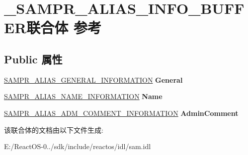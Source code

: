 \hypertarget{union___s_a_m_p_r___a_l_i_a_s___i_n_f_o___b_u_f_f_e_r}{}\section{\+\_\+\+S\+A\+M\+P\+R\+\_\+\+A\+L\+I\+A\+S\+\_\+\+I\+N\+F\+O\+\_\+\+B\+U\+F\+F\+E\+R联合体 参考}
\label{union___s_a_m_p_r___a_l_i_a_s___i_n_f_o___b_u_f_f_e_r}
\subsection*{Public 属性}
\begin{DoxyCompactItemize}
\item 
\mbox{\label{union___s_a_m_p_r___a_l_i_a_s___i_n_f_o___b_u_f_f_e_r_ac69424f6da4a4bd05ef6e1cb63c475ef}} 
\hyperlink{struct___s_a_m_p_r___a_l_i_a_s___g_e_n_e_r_a_l___i_n_f_o_r_m_a_t_i_o_n}{S\+A\+M\+P\+R\+\_\+\+A\+L\+I\+A\+S\+\_\+\+G\+E\+N\+E\+R\+A\+L\+\_\+\+I\+N\+F\+O\+R\+M\+A\+T\+I\+ON} {\bfseries General}
\item 
\mbox{\label{union___s_a_m_p_r___a_l_i_a_s___i_n_f_o___b_u_f_f_e_r_a81bbde9e862f25b075d5a0eec5806db6}} 
\hyperlink{struct___s_a_m_p_r___a_l_i_a_s___n_a_m_e___i_n_f_o_r_m_a_t_i_o_n}{S\+A\+M\+P\+R\+\_\+\+A\+L\+I\+A\+S\+\_\+\+N\+A\+M\+E\+\_\+\+I\+N\+F\+O\+R\+M\+A\+T\+I\+ON} {\bfseries Name}
\item 
\mbox{\label{union___s_a_m_p_r___a_l_i_a_s___i_n_f_o___b_u_f_f_e_r_ade295bf4292b302bd84742dcdd98f7e0}} 
\hyperlink{struct___s_a_m_p_r___a_l_i_a_s___a_d_m___c_o_m_m_e_n_t___i_n_f_o_r_m_a_t_i_o_n}{S\+A\+M\+P\+R\+\_\+\+A\+L\+I\+A\+S\+\_\+\+A\+D\+M\+\_\+\+C\+O\+M\+M\+E\+N\+T\+\_\+\+I\+N\+F\+O\+R\+M\+A\+T\+I\+ON} {\bfseries Admin\+Comment}
\end{DoxyCompactItemize}


该联合体的文档由以下文件生成\+:\begin{DoxyCompactItemize}
\item 
E\+:/\+React\+O\+S-\/0../sdk/include/reactos/idl/sam.\+idl\end{DoxyCompactItemize}
